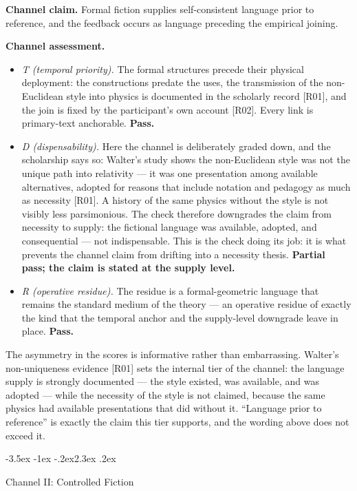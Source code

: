 \documentclass[11pt,a4paper]{article}
\makeatletter
\renewcommand\section{\@startsection{section}{1}{\z@}%
  {-3.5ex \@plus -1ex \@minus -.2ex}{2.3ex \@plus .2ex}%
  {\normalfont\Large\bfseries\raggedright}}
\makeatother
\begin{document}
\textbf{Channel claim.} Formal fiction supplies self-consistent language prior to reference, and the feedback occurs as language preceding the empirical joining.

\textbf{Channel assessment.}

\begin{itemize}[leftmargin=1.6em,itemsep=2pt,parsep=0pt,topsep=3pt]
\item \textit{T (temporal priority).} The formal structures precede their physical deployment: the constructions predate the uses, the transmission of the non-Euclidean style into physics is documented in the scholarly record [R01], and the join is fixed by the participant's own account [R02]. Every link is primary-text anchorable. \textbf{Pass.}
\item \textit{D (dispensability).} Here the channel is deliberately graded down, and the scholarship says so: Walter's study shows the non-Euclidean style was not the unique path into relativity — it was one presentation among available alternatives, adopted for reasons that include notation and pedagogy as much as necessity [R01]. A history of the same physics without the style is not visibly less parsimonious. The check therefore downgrades the claim from necessity to supply: the fictional language was available, adopted, and consequential — not indispensable. This is the check doing its job: it is what prevents the channel claim from drifting into a necessity thesis. \textbf{Partial pass; the claim is stated at the supply level.}
\item \textit{R (operative residue).} The residue is a formal-geometric language that remains the standard medium of the theory — an operative residue of exactly the kind that the temporal anchor and the supply-level downgrade leave in place. \textbf{Pass.}
\end{itemize}

The asymmetry in the scores is informative rather than embarrassing. Walter's non-uniqueness evidence [R01] sets the internal tier of the channel: the language supply is strongly documented — the style existed, was available, and was adopted — while the necessity of the style is not claimed, because the same physics had available presentations that did without it. ``Language prior to reference'' is exactly the claim this tier supports, and the wording above does not exceed it.

\section{Channel II: Controlled Fiction}
\end{document}
